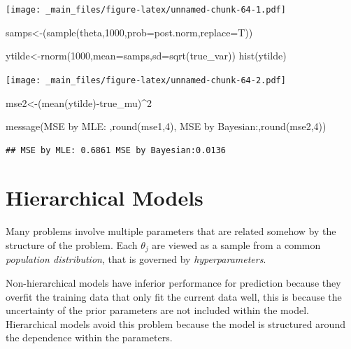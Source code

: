 \documentclass[
]{book}
\newenvironment{Shaded}{\begin{snugshade}}{\end{snugshade}}
\newcommand{\AttributeTok}[1]{\textcolor[rgb]{0.77,0.63,0.00}{#1}}
\newcommand{\DecValTok}[1]{\textcolor[rgb]{0.00,0.00,0.81}{#1}}
\newcommand{\FunctionTok}[1]{\textcolor[rgb]{0.00,0.00,0.00}{#1}}
\newcommand{\NormalTok}[1]{#1}
\newcommand{\OtherTok}[1]{\textcolor[rgb]{0.56,0.35,0.01}{#1}}
\newcommand{\SpecialCharTok}[1]{\textcolor[rgb]{0.00,0.00,0.00}{#1}}
\newcommand{\StringTok}[1]{\textcolor[rgb]{0.31,0.60,0.02}{#1}}
\theoremstyle{definition}
\theoremstyle{definition}
\theoremstyle{definition}
\theoremstyle{definition}
\theoremstyle{remark}
\begin{document}
\texttt{[image: \_main\_files/figure-latex/unnamed-chunk-64-1.pdf]}

\begin{Shaded}
\begin{Highlighting}[]
\NormalTok{ samps}\OtherTok{\textless{}{-}}\NormalTok{(}\FunctionTok{sample}\NormalTok{(theta,}\DecValTok{1000}\NormalTok{,}\AttributeTok{prob=}\NormalTok{post.norm,}\AttributeTok{replace=}\NormalTok{T))}
  
\NormalTok{ytilde}\OtherTok{\textless{}{-}}\FunctionTok{rnorm}\NormalTok{(}\DecValTok{1000}\NormalTok{,}\AttributeTok{mean=}\NormalTok{samps,}\AttributeTok{sd=}\FunctionTok{sqrt}\NormalTok{(true\_var)) }
 \FunctionTok{hist}\NormalTok{(ytilde)}
\end{Highlighting}
\end{Shaded}

\texttt{[image: \_main\_files/figure-latex/unnamed-chunk-64-2.pdf]}

\begin{Shaded}
\begin{Highlighting}[]
\NormalTok{ mse2}\OtherTok{\textless{}{-}}\NormalTok{(}\FunctionTok{mean}\NormalTok{(ytilde)}\SpecialCharTok{{-}}\NormalTok{true\_mu)}\SpecialCharTok{\^{}}\DecValTok{2}
 
 
 \FunctionTok{message}\NormalTok{(}\StringTok{\textquotesingle{}MSE by MLE: \textquotesingle{}}\NormalTok{,}\FunctionTok{round}\NormalTok{(mse1,}\DecValTok{4}\NormalTok{),}\StringTok{\textquotesingle{} MSE by Bayesian:\textquotesingle{}}\NormalTok{,}\FunctionTok{round}\NormalTok{(mse2,}\DecValTok{4}\NormalTok{))}
\end{Highlighting}
\end{Shaded}

\begin{verbatim}
## MSE by MLE: 0.6861 MSE by Bayesian:0.0136
\end{verbatim}

\hypertarget{hierarchical-models}{%
\chapter{Hierarchical Models}\label{hierarchical-models}}

Many problems involve multiple parameters that are related somehow by the structure of the problem. Each \(\theta_j\) are viewed as a sample from a common \emph{population distribution}, that is governed by \emph{hyperparameters}.

Non-hierarchical models have inferior performance for prediction because they overfit the training data that only fit the current data well, this is because the uncertainty of the prior parameters are not included within the model. Hierarchical models avoid this problem because the model is structured around the dependence within the parameters.
\end{document}
